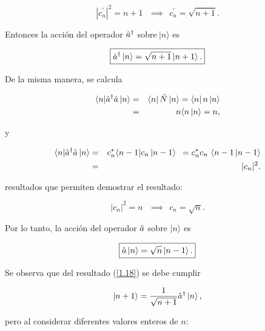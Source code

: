 \begin{equation*}
|c_{n}^{\prime }|^{2}=n+1~\ \ \implies ~\ c_{n}^{\prime }=\sqrt{n+1}.
\end{equation*}

Entonces la acci\'{o}n del operador  $\hat{a}^{\dagger }~$sobre$~|n\rangle $ es 

\begin{equation}
\boxed{
\hat{a}^{\dagger }\left\vert n\right\rangle =\sqrt{n+1}\left\vert n+1\right\rangle .
\label{1.18}
}
\end{equation}

De la misma manera, se calcula

\begin{eqnarray}
\langle n|\hat{a}^{\dagger } \hat{a} \left\vert n\right\rangle  &=&\left\langle
n\right\vert \hat{N} \left\vert n\right\rangle =\left\langle n\right\vert
n\left\vert n\right\rangle   \notag \\
&=&n\langle n\left\vert n\right\rangle =n,  \label{1.18a}
\end{eqnarray}

y 

\begin{eqnarray}
\langle n|\Oaa^{\dagger } \Oaa \left\vert n\right\rangle  &=&c_{n}^{\ast }\langle
n-1|c_{n}\left\vert n-1\right\rangle \text{ }=c_{n}^{\ast }c_{n}\text{\ }%
\langle n-1\left\vert n-1\right\rangle   \notag \\
&=&|c_{n}|^{2}.  \label{1.18b}
\end{eqnarray}

resultados que permiten demostrar el resultado:

\begin{equation*}
|c_{n}|^{2}=n~\ \ \implies ~\ c_{n}=\sqrt{n}.
\end{equation*}

Por lo tanto, la acci\'{o}n del operador $\hat{a}$ sobre $|n\rangle $ es
 
\begin{equation}
\boxed{
\hat{a} \left\vert n\right\rangle =\sqrt{n}\left\vert n-1\right\rangle 
\label{1.19}.
}
\end{equation}

Se observa que del resultado (\ref{1.18}) se debe cumplir

\begin{equation}
\left\vert n+1\right\rangle =\frac{1}{\sqrt{n+1}} \hat{a}^{\dagger }\left\vert
n\right\rangle   \label{1.20},
\end{equation}

pero al considerar diferentes valores enteros de $n$:

